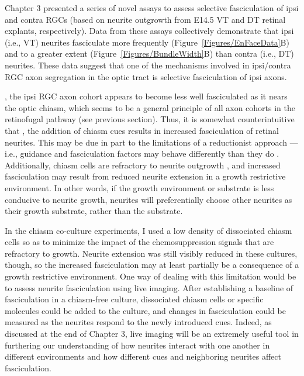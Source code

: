 Chapter 3 presented a series of novel \invitro{} assays to assess selective fasciculation of ipsi and contra RGCs (based on neurite outgrowth from E14.5 VT and DT retinal explants, respectively).
Data from these assays collectively demonstrate that ipsi (i.e., VT) neurites fasciculate more frequently (Figure~\ref{Figures/EnFaceData}B) and to a greater extent (Figure~\ref{Figures/BundleWidth}B) than contra (i.e., DT) neurites.
These data suggest that one of the mechanisms involved in ipsi/contra RGC axon segregation in the optic tract \invivo{} is selective fasciculation of ipsi axons.

\Invivo{}, the ipsi RGC axon cohort appears to become less well fasciculated as it nears the optic chiasm, which seems to be a general principle of all axon cohorts in the retinofugal pathway (see previous section).
Thus, it is somewhat counterintuitive that \invitro{}, the addition of chiasm cues results in increased fasciculation of retinal neurites.
This may be due in part to the limitations of a reductionist \invitro{} approach --- i.e., guidance and fasciculation factors may behave differently \invitro{} than they do \invivo{}.
Additionally, chiasm cells are refractory to neurite outgrowth \invitro{} \cite{wang1995crossed,wang1996chemosuppression}, and increased fasciculation may result from reduced neurite extension in a growth restrictive environment.
In other words, if the growth environment or substrate is less conducive to neurite growth, neurites will preferentially choose other neurites as their growth substrate, rather than the substrate.

In the chiasm co-culture experiments, I used a low density of dissociated chiasm cells so as to minimize the impact of the chemosuppression signals that are refractory to growth.
Neurite extension was still visibly reduced in these cultures, though, so the increased fasciculation may at least partially be a consequence of a growth restrictive environment.
One way of dealing with this limitation would be to assess neurite fasciculation using live imaging.
After establishing a baseline of fasciculation in a chiasm-free culture, dissociated chiasm cells or specific molecules could be added to the culture, and changes in fasciculation could be measured as the neurites respond to the newly introduced cues.
Indeed, as discussed at the end of Chapter 3, live imaging will be an extremely useful tool in furthering our understanding of how neurites interact with one another in different environments and how different cues and neighboring neurites affect fasciculation.

